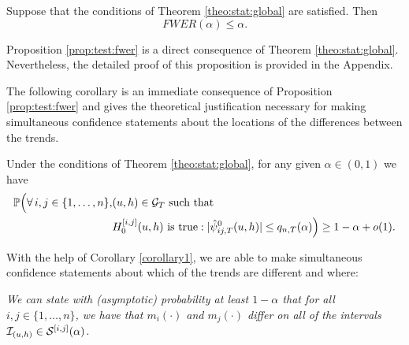 \documentclass[a4paper,12pt]{article}
\begin{document}
\begin{prop}\label{prop:test:fwer}
Suppose that the conditions  of Theorem \ref{theo:stat:global} are satisfied. Then 
\[ FWER(\alpha) \leq \alpha. \]
\end{prop}

Proposition \ref{prop:test:fwer} is a direct consequence of Theorem \ref{theo:stat:global}. Nevertheless, the detailed proof of this proposition is provided in the 
Appendix. 

The following corollary is an immediate consequence of Proposition \ref{prop:test:fwer} and gives the theoretical justification necessary for making simultaneous confidence statements about the locations of the differences between the trends.

\begin{corollary}\label{corollary1}
Under the conditions of Theorem \ref{theo:stat:global}, for any given $\alpha \in (0,1)$ we have
\begin{align*}\mathbb{P}\Big( \forall \, i,j \in \{1, \ldots, n\}, &(u, h) \in \mathcal{G}_T \text{ such that }\\
&H_0^{[i, j]}(u, h) \text{ is true}: |\hat{\psi}^0_{ij,T}(u, h)| \le q_{n,T}(\alpha) \Big) \ge 1 - \alpha + o(1).
\end{align*}
\end{corollary} 


With the help of Corollary \ref{corollary1}, we are able to make simultaneous confidence statements about which of the trends are different and where:

\begin{center}
\begin{minipage}[c][1.75cm][c]{13cm}
\textit{We can state with (asymptotic) probability at least $1-\alpha$ that for all \linebreak $i, j \in \{1,\ldots, n\}$, we have that $m_i(\cdot)$ and $m_j(\cdot)$ differ on all of the intervals $\mathcal{I}_{(u, h)} \in \mathcal{S}^{[i, j]}(\alpha)$.}
\end{minipage}
\end{center}
\end{document}
